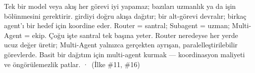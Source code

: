 
 Tek bir model veya akış her görevi iyi yapamaz; bazıları uzmanlık
ya da işin bölünmesini gerektirir.
  girdiyi doğru akışa dağıtır;  bir
alt-görevi devralır;  birkaç agent'ı bir hedef için koordine eder.
 Router = santral; Subagent = uzman; Multi-Agent = ekip. Çoğu işte
santral tek başına yeter.
 Router neredeyse her yerde ucuz değer üretir; Multi-Agent yalnızca
gerçekten ayrışan, paralelleştirilebilir görevlerde.
 Basit bir dağıtım için multi-agent kurmak --- koordinasyon maliyeti ve
öngörülemezlik patlar.
  ·  \,{\scriptsize\color{softgray}(İlke \#11, \#16)}
